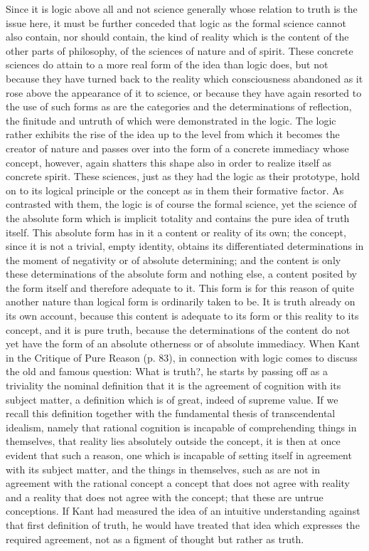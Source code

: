 Since it is logic above all
and not science generally
whose relation to truth is the issue here,
it must be further conceded that
logic as the formal science cannot also contain,
nor should contain, the kind of reality which
is the content of the other parts of philosophy,
of the sciences of nature and of spirit.
These concrete sciences do attain to a more real form
of the idea than logic does,
but not because they have turned back to the reality
which consciousness abandoned as it rose above
the appearance of it to science,
or because they have again resorted to
the use of such forms as are the categories
and the determinations of reflection,
the finitude and untruth of which
were demonstrated in the logic.
The logic rather exhibits the rise of the idea
up to the level from which it becomes the creator of nature
and passes over into the form of a concrete immediacy
whose concept, however, again shatters this shape also
in order to realize itself as concrete spirit.
These sciences, just as they had the logic as their prototype,
hold on to its logical principle or the concept
as in them their formative factor.
As contrasted with them, the logic is of course the formal science,
yet the science of the absolute form which is implicit totality
and contains the pure idea of truth itself.
This absolute form has in it a content or reality of its own;
the concept, since it is not a trivial, empty identity,
obtains its differentiated determinations in
the moment of negativity or of absolute determining;
and the content is only these determinations of
the absolute form and nothing else,
a content posited by the form itself
and therefore adequate to it.
This form is for this reason of quite another nature than
logical form is ordinarily taken to be.
It is truth already on its own account,
because this content is adequate to its form
or this reality to its concept,
and it is pure truth,
because the determinations of the content
do not yet have the form of an absolute otherness
or of absolute immediacy.
When Kant in the Critique of Pure Reason (p. 83),
in connection with logic comes to discuss
the old and famous question:
What is truth?,
he starts by passing off as a triviality
the nominal definition that it is the agreement
of cognition with its subject matter,
a definition which is of great, indeed of supreme value.
If we recall this definition together with
the fundamental thesis of transcendental idealism,
namely that rational cognition is incapable
of comprehending things in themselves,
that reality lies absolutely outside the concept,
it is then at once evident that such a reason,
one which is incapable of setting itself
in agreement with its subject matter,
and the things in themselves,
such as are not in agreement with the rational concept
a concept that does not agree with reality
and a reality that does not agree
with the concept;
that these are untrue conceptions.
If Kant had measured the idea of
an intuitive understanding against
that first definition of truth,
he would have treated that idea
which expresses the required agreement,
not as a figment of thought but rather as truth.

